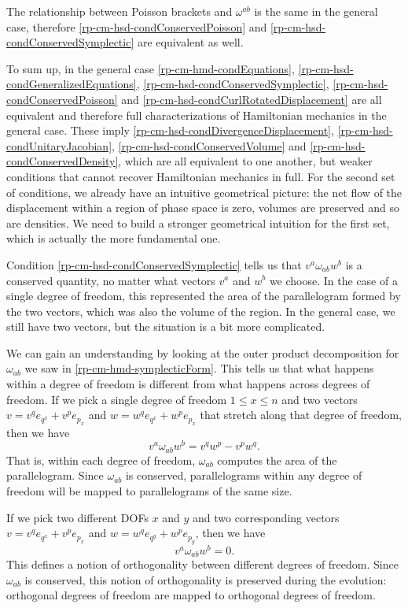 The relationship between Poisson brackets and $\omega^{ab}$ is the same in the general case, therefore \ref{rp-cm-hsd-condConservedPoisson} and \ref{rp-cm-hsd-condConservedSymplectic} are equivalent as well.

To sum up, in the general case \ref{rp-cm-hmd-condEquations}, \ref{rp-cm-hsd-condGeneralizedEquations}, \ref{rp-cm-hsd-condConservedSymplectic}, \ref{rp-cm-hsd-condConservedPoisson} and \ref{rp-cm-hsd-condCurlRotatedDisplacement} are all equivalent and therefore full characterizations of Hamiltonian mechanics in the general case. These imply \ref{rp-cm-hsd-condDivergenceDisplacement}, \ref{rp-cm-hsd-condUnitaryJacobian}, \ref{rp-cm-hsd-condConservedVolume} and \ref{rp-cm-hsd-condConservedDensity}, which are all equivalent to one another, but weaker conditions that cannot recover Hamiltonian mechanics in full. For the second set of conditions, we already have an intuitive geometrical picture: the net flow of the displacement within a region of phase space is zero, volumes are preserved and so are densities. We need to build a stronger geometrical intuition for the first set, which is actually the more fundamental one.

Condition \ref{rp-cm-hsd-condConservedSymplectic} tells us that $v^a \omega_{ab} w^b$ is a conserved quantity, no matter what vectors $v^a$ and $w^b$ we choose. In the case of a single degree of freedom, this represented the area of the parallelogram formed by the two vectors, which was also the volume of the region. In the general case, we still have two vectors, but the situation is a bit more complicated.

We can gain an understanding by looking at the outer product decomposition for $\omega_{ab}$ we saw in \ref{rp-cm-hmd-symplecticForm}. This tells us that what happens within a degree of freedom is different from what happens across degrees of freedom. If we pick a single degree of freedom $1 \leq x \leq n$ and two vectors $v = v^q e_{q^x} + v^p e_{p_x}$ and $w = w^q e_{q^x} + w^p e_{p_x}$ that stretch along that degree of freedom, then we have
\begin{equation}
	v^a \omega_{ab} w^b =  v^q w^p - v^p w^q.
\end{equation}
That is, within each degree of freedom, $\omega_{ab}$ computes the area of the parallelogram. Since $\omega_{ab}$ is conserved, parallelograms within any degree of freedom will be mapped to parallelograms of the same size.

If we pick two different DOFs $x$ and $y$ and two corresponding vectors $v = v^q e_{q^x} + v^p e_{p_x}$ and $w = w^q e_{q^y} + w^p e_{p_y}$, then we have
\begin{equation}
	v^a \omega_{ab} w^b =  0.
\end{equation}
This defines a notion of orthogonality between different degrees of freedom. Since $\omega_{ab}$ is conserved, this notion of orthogonality is preserved during the evolution: orthogonal degrees of freedom are mapped to orthogonal degrees of freedom.

